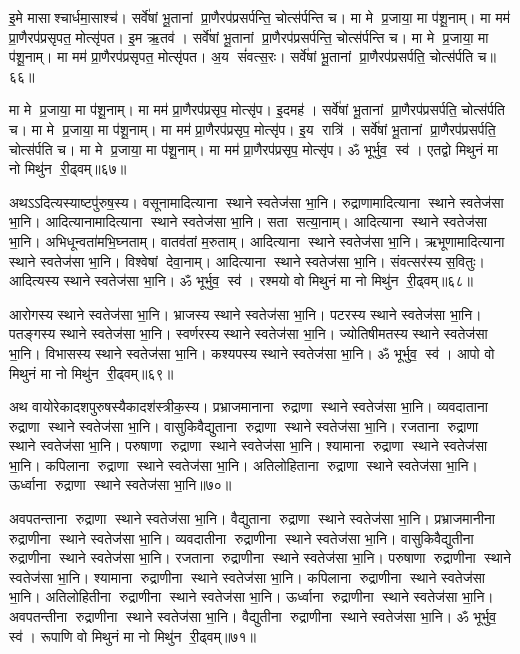 इ॒मे मासाश्चार्धमा॒साश्च॑। सर्वे॑षां भू॒तानां प्रा॒णैरप॑प्रसर्पन्ति॒ चोत्स॑र्पन्ति च। 
मा मे प्र॒जाया॒ मा प॑शू॒नाम्‌। मा मम॑ प्रा॒णैरप॑प्रसृपत॒ मोत्सृ॑पत। 
इ॒म ऋ॒तव॑। सर्वे॑षां भू॒तानां प्रा॒णैरप॑प्रसर्पन्ति॒ चोत्स॑र्पन्ति च। 
मा मे प्र॒जाया॒ मा प॑शू॒नाम्‌। मा मम॑ प्रा॒णैरप॑प्रसृपत॒ मोत्सृ॑पत। 
अ॒य सं॑वत्स॒रः। सर्वे॑षां भू॒तानां प्रा॒णैरप॑प्रसर्पति॒ चोत्स॑र्पति च॥६६॥


मा मे प्र॒जाया॒ मा प॑शू॒नाम्‌। मा मम॑ प्रा॒णैरप॑प्रसृप॒ मोत्सृ॑प। 
इ॒दमह॑। सर्वे॑षां भू॒तानां प्रा॒णैरप॑प्रसर्पति॒ चोत्स॑र्पति च। 
मा मे प्र॒जाया॒ मा प॑शू॒नाम्‌। मा मम॑ प्रा॒णैरप॑प्रसृप॒ मोत्सृ॑प। 
इ॒य रात्रि॑। सर्वे॑षां भू॒तानां प्रा॒णैरप॑प्रसर्पति॒ चोत्स॑र्पति च। 
मा मे प्र॒जाया॒ मा प॑शू॒नाम्‌। मा मम॑ प्रा॒णैरप॑प्रसृप॒ मोत्सृ॑प। 
ॐ भूर्भुव॒ स्व॑। एतद्वो मिथुनं मा नो मिथु॑न री॒ढ्वम्॥६७॥\anuvakamend


अथऽऽदित्यस्याष्टपु॑रुष॒स्य। 
वसूनामादित्याना स्थाने स्वतेज॑सा भा॒नि। 
रुद्राणामादित्याना स्थाने स्वतेज॑सा भा॒नि। 
आदित्यानामादि\-त्याना स्थाने स्वतेज॑सा भा॒नि। 
सता सत्या॒नाम्‌। आदित्याना स्थाने स्वतेज॑सा भा॒नि। 
अभिधून्वता॑\-मभि॒घ्नताम्‌। वातव॑तां म॒रुताम्‌। 
आदित्याना स्थाने स्वतेज॑सा भा॒नि। 
ऋभूणामादित्याना स्थाने स्वतेज॑सा भा॒नि। 
विश्वेषां देवा॒नाम्‌। आदित्याना स्थाने स्वतेज॑सा भा॒नि। 
संवत्सर॑स्य स॒वितुः। आदित्यस्य स्थाने स्वतेज॑सा भा॒नि। 
ॐ भूर्भुव॒ स्व॑। रश्मयो वो मिथुनं मा नो मिथु॑न री॒ढ्वम्॥६८॥\anuvakamend


आरोगस्य स्थाने स्वतेज॑सा भा॒नि। भ्राजस्य स्थाने स्वतेज॑सा भा॒नि। 
पटरस्य स्थाने स्वतेज॑सा भा॒नि। पतङ्गस्य स्थाने स्वतेज॑सा भा॒नि। 
स्वर्णरस्य स्थाने स्वतेज॑सा भा॒नि। ज्योतिषीमतस्य स्थाने स्वतेज॑सा भा॒नि। 
विभासस्य स्थाने स्वतेज॑सा भा॒नि। कश्यपस्य स्थाने स्वतेज॑सा भा॒नि। 
ॐ भूर्भुव॒ स्व॑। आपो वो मिथुनं मा नो मिथु॑न री॒ढ्वम्॥६९॥\anuvakamend


अथ वायोरेकादशपुरुषस्यैकादश॑स्त्रीक॒स्य। 
प्रभ्राजमानाना रुद्राणा स्थाने स्वतेज॑सा भा॒नि। 
व्यवदाताना रुद्राणा स्थाने स्वतेज॑सा भा॒नि। 
वासुकिवैद्युताना रुद्राणा स्थाने स्वतेज॑सा भा॒नि। 
रजताना रुद्राणा स्थाने स्वतेज॑सा भा॒नि। 
परुषाणा रुद्राणा स्थाने स्वतेज॑सा भा॒नि। 
श्यामाना रुद्राणा स्थाने स्वतेज॑सा भा॒नि। 
कपिलाना रुद्राणा स्थाने स्वतेज॑सा भा॒नि। 
अतिलोहिताना रुद्राणा स्थाने स्वतेज॑सा भा॒नि। 
ऊर्ध्वाना रुद्राणा स्थाने स्वतेज॑सा भा॒नि॥७०॥


अवपतन्ताना रुद्राणा स्थाने स्वतेज॑सा भा॒नि। 
वैद्युताना रुद्राणा स्थाने स्वतेज॑सा भा॒नि। 
प्रभ्राजमानीना रुद्राणीना स्थाने स्वतेज॑सा भा॒नि। 
व्यवदातीना रुद्राणीना स्थाने स्वतेज॑सा भा॒नि। 
वासुकिवैद्युतीना रुद्राणीना स्थाने स्वतेज॑सा भा॒नि। 
रजताना रुद्राणीना स्थाने स्वतेज॑सा भा॒नि। 
परुषाणा रुद्राणीना स्थाने स्वतेज॑सा भा॒नि। 
श्यामाना रुद्राणीना स्थाने स्वतेज॑सा भा॒नि। 
कपिलाना रुद्राणीना स्थाने स्वतेज॑सा भा॒नि। 
अतिलोहितीना रुद्राणीना स्थाने स्वतेज॑सा भा॒नि। 
ऊर्ध्वाना रुद्राणीना स्थाने स्वतेज॑सा भा॒नि। 
अवपतन्तीना रुद्राणीना स्थाने स्वतेज॑सा भा॒नि। 
वैद्युतीना रुद्राणीना स्थाने स्वतेज॑सा भा॒नि। 
ॐ भूर्भुव॒ स्व॑। रूपाणि वो मिथुनं मा नो मिथु॑न री॒ढ्वम्॥७१॥\anuvakamend


